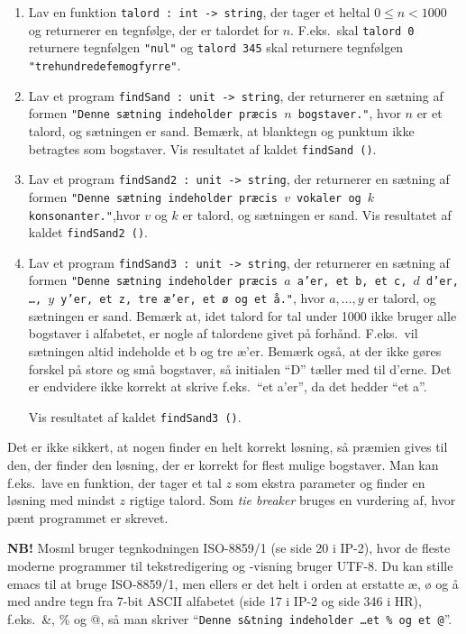 \documentclass[a4paper,12pt]{article}
\begin{document}
\begin{enumerate}[{2}N1]

\item Lav en funktion \texttt{talord : int -> string}, der tager et
  heltal $0 \leq n < 1000$ og returnerer en tegnfølge, der er talordet
  for $n$.  F.eks.\ skal \texttt{talord 0} returnere tegnfølgen
  \texttt{"nul"} og \texttt{talord 345} skal returnere tegnfølgen
  \texttt{"trehundredefemogfyrre"}.

\item Lav et program \texttt{findSand : unit -> string}, der
  returnerer en sætning af formen \texttt{"Denne sætning indeholder
    præcis $n$ bogstaver."}, hvor $n$ er et talord, og sætningen er
  sand.  Bemærk, at blanktegn og punktum ikke betragtes som bogstaver.
  Vis resultatet af kaldet \texttt{findSand ()}.

\item Lav et program \texttt{findSand2 : unit -> string}, der
  returnerer en sætning af formen \texttt{"Denne sætning indeholder
    præcis $v$ vokaler og $k$ konsonanter."},\newline hvor $v$ og $k$ er
  talord, og sætningen er sand. Vis resultatet af kaldet
  \texttt{findSand2\,()}.

\item Lav et program \texttt{findSand3 : unit -> string}, der
  returnerer en sætning af formen \texttt{"Denne sætning indeholder
    præcis $a$ a'er, et b, et c, $d$ d'er, \ldots, $y$ y'er, et z, tre
    æ'er, et ø og et å."}, hvor $a, \ldots, y$ er talord, og sætningen
  er sand.  Bemærk at, idet talord for tal under 1000 ikke bruger
  alle bogstaver i alfabetet, er nogle af talordene givet på forhånd.
  F.eks.\ vil sætningen altid indeholde et b og tre æ'er.  Bemærk
  også, at der ikke gøres forskel på store og små bogstaver, så
  initialen ``D'' tæller med til d'erne.  Det er endvidere ikke
  korrekt at skrive f.eks.\ ``et a'er'', da det hedder ``et a''.

  Vis resultatet af kaldet \texttt{findSand3 ()}.

\end{enumerate}

Det er ikke sikkert, at nogen finder en helt korrekt løsning, så
præmien gives til den, der finder den løsning, der er korrekt for
flest mulige bogstaver.  Man kan f.eks.\ lave en funktion, der tager
et tal $z$ som ekstra parameter og finder en løsning med mindst $z$
rigtige talord.  Som \emph{tie breaker} bruges en vurdering af, hvor
pænt programmet er skrevet.

{\bf NB!} Mosml bruger tegnkodningen ISO-8859/1 (se side 20 i IP-2),
hvor de fleste moderne programmer til tekstredigering og -visning
bruger UTF-8.  Du kan stille emacs til at bruge ISO-8859/1, men ellers
er det helt i orden at erstatte æ, ø og å med andre tegn fra 7-bit
ASCII alfabetet (side 17 i IP-2 og side 346 i HR), f.eks.\ \&, \% og
@, så man skriver ``\texttt{Denne s\&tning indeholder \ldots et \% og
  et @}''.
\end{document}
